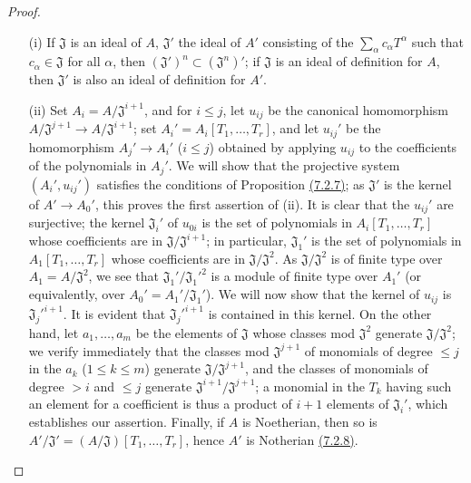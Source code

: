 \begin{proof}
\label{proof-prop-0.7.5.4}
\medskip\noindent
\begin{itemize}
  \item[(i)] If $\mathfrak{J}$ is an ideal of $A$, $\mathfrak{J}'$ the ideal of $A'$
    consisting of the $\sum_\alpha c_\alpha T^\alpha$ such that $c_\alpha\in\mathfrak{J}$
    for all $\alpha$, then $(\mathfrak{J}')^n\subset(\mathfrak{J}^n)'$; if $\mathfrak{J}$
    is an ideal of definition for $A$, then $\mathfrak{J}'$ is also an ideal of definition
    for $A'$.
  \item[(ii)] Set $A_i=A/\mathfrak{J}^{i+1}$, and for $i\leqslant j$, let $u_{ij}$ be the
    canonical homomorphism $A/\mathfrak{J}^{j+1}\to A/\mathfrak{J}^{i+1}$; set
    $A_i'=A_i[T_1,\dots,T_r]$, and let $u_{ij}'$ be the homomorphism $A_j'\to A_i'$
    ($i\leqslant j$) obtained by applying $u_{ij}$ to the coefficients of the polynomials
    in $A_j'$. We will show that the projective system $(A_i',u_{ij}')$ satisfies the conditions
    of Proposition \hyperref[prop-0.7.2.7]{(7.2.7)}; as $\mathfrak{J}'$ is the kernel of
    $A'\to A_0'$, this proves the first assertion of (ii). It is clear that the $u_{ij}'$ are
    surjective; the kernel $\mathfrak{J}_i'$ of $u_{0i}$ is the set of polynomials in
    $A_i[T_1,\dots,T_r]$ whose coefficients are in $\mathfrak{J}/\mathfrak{J}^{i+1}$; in
    particular, $\mathfrak{J}_1'$ is the set of polynomials in $A_1[T_1,\dots,T_r]$ whose
    coefficients are in $\mathfrak{J}/\mathfrak{J}^2$. As $\mathfrak{J}/\mathfrak{J}^2$ is
    of finite type over $A_1=A/\mathfrak{J}^2$, we see that $\mathfrak{J}_1'/{\mathfrak{J}_1'}^2$
    is a module of finite type over $A_1'$ (or equivalently, over $A_0'=A_1'/\mathfrak{J}_1'$).
    We will now show that the kernel of $u_{ij}$ is ${\mathfrak{J}_j'}^{i+1}$. It is evident that
    ${\mathfrak{J}_j'}^{i+1}$ is contained in this kernel. On the other hand, let $a_1,\dots,a_m$
    be the elements of $\mathfrak{J}$ whose classes mod $\mathfrak{J}^2$ generate
    $\mathfrak{J}/\mathfrak{J}^2$; we verify immediately that the classes mod $\mathfrak{J}^{j+1}$
    of monomials of degree $\leqslant j$ in the $a_k$ ($1\leqslant k\leqslant m$) generate
    $\mathfrak{J}/\mathfrak{J}^{j+1}$, and the classes of monomials of degree $>i$ and
    $\leqslant j$ generate $\mathfrak{J}^{i+1}/\mathfrak{J}^{j+1}$; a monomial in the $T_k$
    having such an element for a coefficient is thus a product of $i+1$ elements of
    $\mathfrak{J}_i'$, which establishes our assertion. Finally, if $A$ is Noetherian, then so
    is $A'/\mathfrak{J}'=(A/\mathfrak{J})[T_1,\dots,T_r]$, hence $A'$ is Notherian
    \hyperref[cor-0.7.2.8]{(7.2.8)}.
\end{itemize}
\end{proof}

